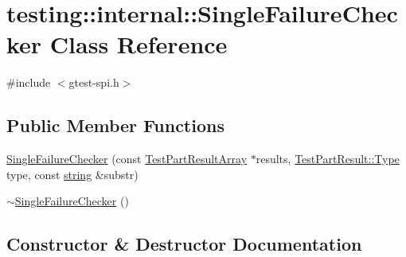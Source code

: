\hypertarget{classtesting_1_1internal_1_1_single_failure_checker}{}\section{testing\+:\+:internal\+:\+:Single\+Failure\+Checker Class Reference}
\label{classtesting_1_1internal_1_1_single_failure_checker}


{\ttfamily \#include $<$gtest-\/spi.\+h$>$}

\subsection*{Public Member Functions}
\begin{DoxyCompactItemize}
\item 
\hyperlink{classtesting_1_1internal_1_1_single_failure_checker_a6d350d385526c97c9982e928f5f8fb56}{Single\+Failure\+Checker} (const \hyperlink{classtesting_1_1_test_part_result_array}{Test\+Part\+Result\+Array} $\ast$results, \hyperlink{classtesting_1_1_test_part_result_a65ae656b33fdfdfffaf34858778a52d5}{Test\+Part\+Result\+::\+Type} type, const \hyperlink{namespacetesting_1_1internal_a8e8ff5b11e64078831112677156cb111}{string} \&substr)
\item 
\hyperlink{classtesting_1_1internal_1_1_single_failure_checker_a4b0a907c9c1b350c79d70af138e9f0bf}{$\sim$\+Single\+Failure\+Checker} ()
\end{DoxyCompactItemize}


\subsection{Constructor \& Destructor Documentation}
\hypertarget{classtesting_1_1internal_1_1_single_failure_checker_a6d350d385526c97c9982e928f5f8fb56}{}
